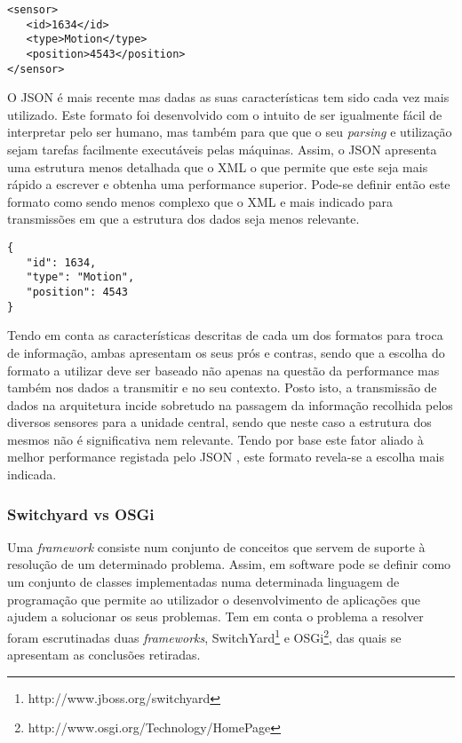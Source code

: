 \begin{lstlisting}[caption=Descrição de um sensor em XML]
<sensor>
   <id>1634</id>
   <type>Motion</type>
   <position>4543</position>
</sensor>
\end{lstlisting}



O JSON é mais recente mas dadas as suas características tem sido cada vez mais utilizado. Este formato foi desenvolvido com o intuito de ser igualmente fácil de interpretar pelo ser humano, mas também para que que o seu \textit{parsing} e utilização sejam tarefas facilmente executáveis pelas máquinas. Assim, o JSON apresenta uma estrutura menos detalhada que o XML o que permite que este seja mais rápido a escrever e obtenha uma performance superior. Pode-se definir então este formato como sendo menos complexo que o XML e mais indicado para transmissões em que a estrutura dos dados seja menos relevante.

\begin{lstlisting}[caption=Descrição de um sensor em JSON]
{
   "id": 1634,
   "type": "Motion",
   "position": 4543
}
\end{lstlisting}


Tendo em conta as características descritas de cada um dos formatos para troca de informação, ambas apresentam os seus prós e contras, sendo que a escolha do formato a utilizar deve ser baseado não apenas na questão da performance mas também nos dados a transmitir e no seu contexto. Posto isto, a transmissão de dados na arquitetura incide sobretudo na passagem da informação recolhida pelos diversos sensores para a unidade central, sendo que neste caso a estrutura dos mesmos não é significativa nem relevante. Tendo por base este fator aliado à melhor performance registada pelo JSON \cite{nurseitov2009comparison} , este formato revela-se a escolha mais indicada.


\subsubsection{Switchyard vs OSGi}

Uma \textit{framework} consiste num conjunto de conceitos que servem de suporte à resolução de um determinado problema. Assim, em software pode se definir como um conjunto de classes implementadas numa determinada linguagem de programação que permite ao utilizador o desenvolvimento de aplicações que ajudem a solucionar os seus problemas. Tem em conta o problema a resolver foram escrutinadas duas \textit{frameworks}, SwitchYard\footnote{http://www.jboss.org/switchyard} e OSGi\footnote{http://www.osgi.org/Technology/HomePage}, das quais se apresentam as conclusões retiradas.


